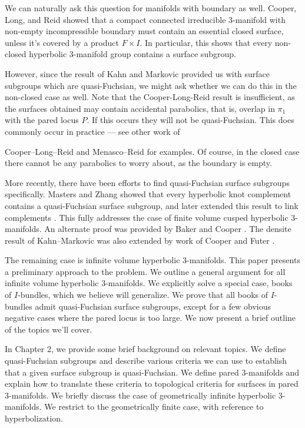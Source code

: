 We can naturally ask this question for manifolds with boundary as well.
Cooper, Long, and Reid showed \cite{CLR} that a compact connected irreducible
3-manifold with non-empty incompressible boundary  must contain an essential
closed surface, unless it's covered by a product $F\times I$. In particular,
this shows that every non-closed hyperbolic 3-manifold group contains a surface
subgroup.

However, since the result of Kahn and Markovic provided us with surface
subgroups which are quasi-Fuchsian, we might ask whether we can do this in the
non-closed case as well. Note that the Cooper-Long-Reid result is insufficient,
as the surfaces obtained may contain accidental parabolics, that is, overlap in
$\pi_1$ with the pared locus $P$. If this occurs they will not be
quasi-Fuchsian. This does commonly occur in practice --- see other work of

Cooper--Long--Reid \cite{CLRbundles} and Menasco--Reid \cite{MenascoReid} for
examples.  Of course, in the closed case there cannot be any parabolics to
worry about, as the boundary is empty.

More recently, there have been efforts to find quasi-Fuchsian surface subgroups
specifically. Masters and Zhang \cite{MZ} showed that every hyperbolic knot
complement contains a quasi-Fuchsian surface subgroup, and later extended this
result to link complements \cite{MZ2}. This fully addresses the case of finite
volume cusped hyperbolic 3-manifolds. An alternate proof was provided by Baker
and Cooper \cite{BC}. The densite result of Kahn--Markovic was also extended by
work of Cooper and Futer \cite{CooperFuter}.

The remaining case is infinite volume hyperbolic 3-manifolds. This paper
presents a preliminary approach to the problem. We outline a general argument
for all infinite volume hyperbolic 3-manifolds. We explicitly solve a special
case, books of $I$-bundles, which we believe will generalize. We prove that all
books of $I$-bundles admit quasi-Fuchsian surface subgroups, except for a few
obvious negative cases where the pared locus is too large. We now present
a brief outline of the topics we'll cover.

In Chapter 2, we provide some brief background on relevant topics. We define
quasi-Fuchsian subgroups and describe various criteria we can use to establish
that a given surface subgroup is quasi-Fuchsian. We define pared 3-manifolds
and explain how to translate these criteria to topological criteria for
surfaces in pared 3-manifolds. We briefly discuss the case of geometrically
infinite hyperbolic 3-manifolds. We restrict to the geometrically finite case,
with reference to hyperbolization.

